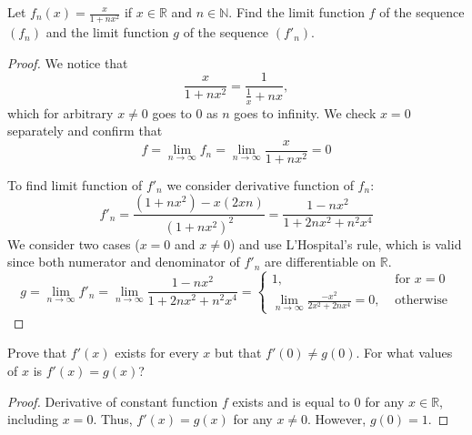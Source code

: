 \documentclass{article}
\begin{document}
\begin{tcolorbox}
Let $f_n (x) = \frac{x}{1 + nx^2}$ if $x \in \mathbb{R}$ and $n \in \mathbb{N}$. Find the limit function $f$ of the sequence $(f_n)$ and the limit function $g$ of the sequence $(f'_n)$. 
\end{tcolorbox}
\begin{proof}
We notice that
$$ \frac{x}{1 + nx^2} = \frac{1}{\frac{1}{x}+nx}, $$
which for arbitrary $x \neq 0$ goes to $0$ as $n$ goes to infinity. We check $x=0$ separately and confirm that
$$ f = \lim_{n\to\infty} f_n = \lim_{n\to\infty} \frac{x}{1 + nx^2} = 0 $$

To find limit function of $f'_n$ we consider derivative function of $f_n$:
$$ f'_n = \frac{(1+nx^2) - x (2xn)}{(1+nx^2)^2} = \frac{1-nx^2}{1+2nx^2+n^2x^4} $$
We consider two cases ($x=0$ and $x\neq0$) and use L'Hospital's rule, which is valid since both numerator and denominator of $f'_n$ are differentiable on $\mathbb{R}$.
$$ g = \lim_{n\to\infty } f'_n = \lim_{n\to\infty } \frac{1-nx^2}{1+2nx^2+n^2x^4} = \begin{cases}
    1, & \text{ for $x = 0$} \\
    \lim_{n\to\infty} \frac{-x^2}{2x^2+2nx^4} = 0, & \text{ otherwise}
\end{cases}
$$
\end{proof}

\begin{tcolorbox}
Prove that $f'(x)$ exists for every $x$ but that $f'(0) \neq g(0)$. For what values of $x$ is $f'(x) = g(x)$? 
\end{tcolorbox}
\begin{proof}
Derivative of constant function $f$ exists and is equal to $0$ for any $x \in \mathbb{R}$, including $x=0$. Thus, $f'(x) = g(x)$ for any $x\neq0$. However, $g(0)=1$.
\end{proof}
\end{document}
